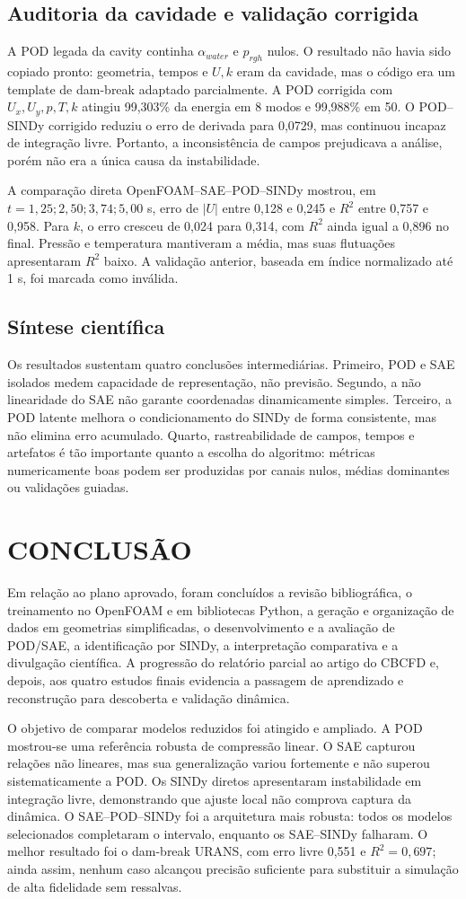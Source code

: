 \documentclass[12pt,a4paper]{article}
\newcommand{\novasecao}[1]{\clearpage\section{#1}}
\begin{document}
\subsection{Auditoria da cavidade e validação corrigida}
A POD legada da cavity continha $\alpha_{water}$ e $p_{rgh}$ nulos. O resultado não havia sido copiado pronto: geometria, tempos e $U,k$ eram da cavidade, mas o código era um template de dam-break adaptado parcialmente. A POD corrigida com $U_x,U_y,p,T,k$ atingiu 99,303\% da energia em 8 modos e 99,988\% em 50. O POD--SINDy corrigido reduziu o erro de derivada para 0,0729, mas continuou incapaz de integração livre. Portanto, a inconsistência de campos prejudicava a análise, porém não era a única causa da instabilidade.

A comparação direta OpenFOAM--\allowbreak SAE--\allowbreak POD--\allowbreak SINDy mostrou, em $t=1,25;2,50;3,74;5,00$ s, erro de $|U|$ entre 0,128 e 0,245 e $R^2$ entre 0,757 e 0,958. Para $k$, o erro cresceu de 0,024 para 0,314, com $R^2$ ainda igual a 0,896 no final. Pressão e temperatura mantiveram a média, mas suas flutuações apresentaram $R^2$ baixo. A validação anterior, baseada em índice normalizado até 1 s, foi marcada como inválida.

\subsection{Síntese científica}
Os resultados sustentam quatro conclusões intermediárias. Primeiro, POD e SAE isolados medem capacidade de representação, não previsão. Segundo, a não linearidade do SAE não garante coordenadas dinamicamente simples. Terceiro, a POD latente melhora o condicionamento do SINDy de forma consistente, mas não elimina erro acumulado. Quarto, rastreabilidade de campos, tempos e artefatos é tão importante quanto a escolha do algoritmo: métricas numericamente boas podem ser produzidas por canais nulos, médias dominantes ou validações guiadas.

\novasecao{CONCLUSÃO}
Em relação ao plano aprovado, foram concluídos a revisão bibliográfica, o treinamento no OpenFOAM e em bibliotecas Python, a geração e organização de dados em geometrias simplificadas, o desenvolvimento e a avaliação de POD/SAE, a identificação por SINDy, a interpretação comparativa e a divulgação científica. A progressão do relatório parcial ao artigo do CBCFD e, depois, aos quatro estudos finais evidencia a passagem de aprendizado e reconstrução para descoberta e validação dinâmica.

O objetivo de comparar modelos reduzidos foi atingido e ampliado. A POD mostrou-se uma referência robusta de compressão linear. O SAE capturou relações não lineares, mas sua generalização variou fortemente e não superou sistematicamente a POD. Os SINDy diretos apresentaram instabilidade em integração livre, demonstrando que ajuste local não comprova captura da dinâmica. O SAE--POD--SINDy foi a arquitetura mais robusta: todos os modelos selecionados completaram o intervalo, enquanto os SAE--SINDy falharam. O melhor resultado foi o dam-break URANS, com erro livre 0,551 e $R^2=0,697$; ainda assim, nenhum caso alcançou precisão suficiente para substituir a simulação de alta fidelidade sem ressalvas.
\end{document}
